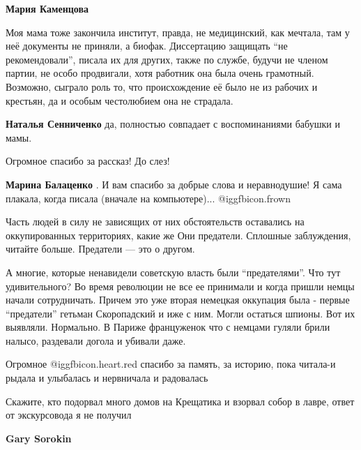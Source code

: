 \begin{itemize}
\begin{itemize}
\begin{itemize} %
\textbf{Мария Каменцова} 

Моя мама тоже закончила институт, правда, не медицинский, как мечтала, там у
неё документы не приняли, а биофак. Диссертацию защищать \enquote{не рекомендовали},
писала их для других, также по службе, будучи не членом партии, не особо
продвигали, хотя работник она была очень грамотный. Возможно, сыграло роль то,
что происхождение её было не из рабочих и крестьян, да и особым честолюбием она
не страдала.

\end{itemize} %

\textbf{Наталья Сенниченко} да, полностью совпадает с воспоминаниями бабушки и мамы.

\end{itemize} %

Огромное спасибо за рассказ! До слез!

\textbf{Марина Балаценко} . И вам спасибо за добрые слова и неравнодушие! Я сама плакала, когда писала (вначале на компьютере)...  @igg{fbicon.frown} 


Часть людей в силу не зависящих от них обстоятельств оставались на
оккупированных территориях, какие же Они предатели. Сплошные заблуждения,
читайте больше. Предатели — это о другом.

\begin{itemize} %

А многие, которые ненавидели советскую власть были \enquote{предателями}. Что тут
удивительного? Во время революции не все ее принимали и когда пришли немцы
начали сотрудничать. Причем это уже вторая немецкая оккупация была - первые
\enquote{предатели} гетьман Скоропадский и иже с ним. Могли остаться шпионы. Вот их
выявляли. Нормально. В Париже француженок что с немцами гуляли брили
налысо, раздевали догола и убивали даже.

\end{itemize} %

Огромное @igg{fbicon.heart.red} спасибо за память, за историю, пока читала-и
рыдала и улыбалась и нервничала и радовалась

Скажите, кто подорвал много домов на Крещатика и взорвал собор в лавре, ответ
от экскурсовода я не получил

\begin{itemize} %
\textbf{Gary Sorokin} 


\end{itemize}
\end{itemize}
